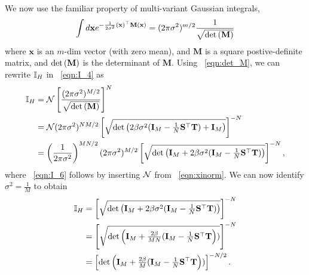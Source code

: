 We now use the familiar property of multi-variant Gaussian integrals,
\begin{align}
\label{eqn:det_M}
\int d\mathbf{x}  e^{-\frac{1}{2\sigma^{2}}(\mathbf{x})^{\top}\mathbf{M}(\mathbf{x}) } = (2\pi\sigma^{2})^{m/2}\frac{1}{\sqrt{\mbox{}{\text{det}}\left( \mathbf{M}\right)}}
\end{align}
where $\mathbf{x}$ is an $m$-dim vector (with zero mean),
and $\mathbf{M}$ is a square postive-definite matrix, and $\mbox{}{\text{det}}\left( \mathbf{M}\right)$ is the determinant of $\mathbf{M}$.
%
Using \EQN~\ref{eqn:det_M}, we can rewrite $\mathbb{I}_{H}$ in \EQN~\ref{eqn:I_4} as
\begin{align}
\label{eqn:I_5}
\mathbb{I}_{H} &=   \mathcal{N}\left[\frac{(2\pi\sigma^{2})^{M/2}}{\sqrt{\mbox{}{\text{det}}\left( \mathbf{M}\right)}}\right]^{N} \\ \nonumber
    &=   \mathcal{N}(2\pi\sigma^2)^{NM/2}\left[
         \sqrt{\mbox{}{\text{det}}\left( 2\beta\sigma^2(\mathbf{I}_{M}-\tfrac{1}{N}{\mathbf{S}}^{\top}{\mathbf{T}})+\mathbf{I}_{M}\right)}\right]^{-N}  \\
\label{eqn:I_6}
   &=  \left( \frac{1}{2\pi\sigma^{2}} \right)^{MN/2}
       (2\pi \sigma^{2})^{M/2}
         \left[\sqrt{\mbox{}{\text{det}}\left( \mathbf{I}_{M} + 2\beta\sigma^{2}(\mathbf{I}_{M}-\tfrac{1}{N}{\mathbf{S}}^{\top}{\mathbf{T}})\right)}\right]^{-N}  ,
\end{align}
where \EQN~\ref{eqn:I_6} follows by inserting $\mathcal{N}$ from \EQN~\ref{eqn:xinorm}.
We can now identify $\sigma^{2}=\tfrac{1}{M}$ to obtain
\begin{align}
\nonumber
\mathbb{I}_{H} &= \left[\sqrt{\mbox{}{\text{det}}\left( \mathbf{I}_{M} + 2\beta\sigma^{2}(\mathbf{I}_{M}-\tfrac{1}{N}{\mathbf{S}}^{\top}{\mathbf{T}})\right)}\right]^{-N}   \\ 
\nonumber
    &= \left[\sqrt{\mbox{}{\text{det}}\left( \mathbf{I}_{M}  + \tfrac{2\beta}{MN}(\mathbf{I}_{M}-\tfrac{1}{N}{\mathbf{S}}^{\top}{\mathbf{T}}\right))}\right]^{-N} \\ 
\label{eqn:I_7}
    &= \left[\mbox{}{\text{det}}\left( \mathbf{I}_{M}  + \tfrac{2\beta}{M}(\mathbf{I}_{M}-\tfrac{1}{N}{\mathbf{S}}^{\top}{\mathbf{T}}\right))\right]^{-N/2}  .
\end{align}

